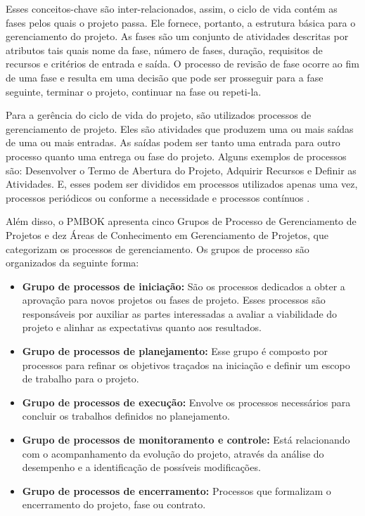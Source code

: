 \documentclass[
    12pt,       %
    openright,      %
    twoside,      %
    a4paper,      %
    english,      %
    french,       %
    spanish,      %
    brazil,       %
    ]{abntex2}
\begin{document}
Esses conceitos-chave são inter-relacionados, assim, o ciclo de vida contém as fases pelos quais o projeto passa. Ele fornece, portanto, a estrutura básica para o gerenciamento do projeto. As fases são um conjunto de atividades descritas por atributos tais quais nome da fase, número de fases, duração, requisitos de recursos e critérios de entrada e saída. O processo de revisão de fase ocorre ao fim de uma fase e resulta em uma decisão que pode ser prosseguir para a fase seguinte, terminar o projeto, continuar na fase ou repeti-la.

Para a gerência do ciclo de vida do projeto, são utilizados processos de gerenciamento de projeto. Eles são atividades que produzem uma ou mais saídas de uma ou mais entradas. As saídas podem ser tanto uma entrada para outro processo quanto uma entrega ou fase do projeto. Alguns exemplos de processos são: Desenvolver o Termo de Abertura do Projeto, Adquirir Recursos e Definir as Atividades. E, esses podem ser divididos em processos utilizados apenas uma vez, processos periódicos ou conforme a necessidade e processos contínuos \cite{PMBOK:2017}.

Além disso, o PMBOK \cite{PMBOK:2017} apresenta cinco Grupos de Processo de Gerenciamento de Projetos e dez Áreas de Conhecimento em Gerenciamento de Projetos, que categorizam os processos de gerenciamento. Os grupos de processo são organizados da seguinte forma:

\begin{itemize}
    \item \textbf{Grupo de processos de iniciação:} São os processos dedicados a obter a aprovação para novos projetos ou fases de projeto. Esses processos são responsáveis por auxiliar as partes interessadas a avaliar a viabilidade do projeto e alinhar as expectativas quanto aos resultados.
    \item \textbf{Grupo de processos de planejamento:} Esse grupo é composto por processos para refinar os objetivos traçados na iniciação e definir um escopo de trabalho para o projeto.
    \item \textbf{Grupo de processos de execução:} Envolve os processos necessários para concluir os trabalhos definidos no planejamento. 
    \item \textbf{Grupo de processos de monitoramento e controle:} Está relacionando com o acompanhamento da evolução do projeto, através da análise do desempenho e a identificação de possíveis modificações.
    \item \textbf{Grupo de processos de encerramento:} Processos que formalizam o encerramento do projeto, fase ou contrato.
\end{itemize}
\end{document}
